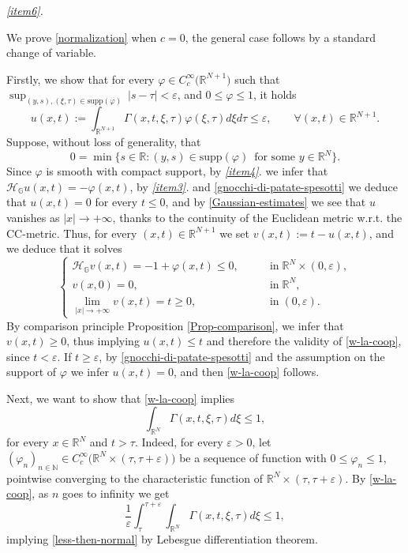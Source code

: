 \documentclass[11pt,a4paper]{article}
\numberwithin{equation}{section}
\newcommand{\R}{\mathbb{R}}
\newcommand{\N}{\mathbb{N}}
\def \rn {{\mathbb {R}}^{N}}
\def \rnn {{\mathbb {R}}^{N+1}}
\def \GG {{\mathbb{G}}}
\def \H {\mathscr{H}_\GG}
\def \G {{\Gamma}}
\def \e {{\varepsilon}}
\def \t {{\tau}}
\def \x {{\xi}}
\def \phi {{\varphi}}
\begin{document}
\begin{pf-fundamental}
	
	\medskip\emph{\ref{item6}.}
	
	
	We prove \eqref{normalization} when $c=0$, the general case follows by a standard change of variable. 
	
	
	Firstly, we show that for every $\phi\in C_c^\infty\big(\rnn\big)$ such that $\sup_{(y,s),(\x,\t)\in \mathrm{supp}(\phi)}\ |s-\t|<\e$, and $0\leq \phi \leq 1$, it holds
	\begin{equation}\label{w-la-coop}
		u(x,t):=\int_{\rnn}\G(x,t,\x,\t)\phi(\x,\t)d\x d\t \leq \e,\qquad \forall (x,t)\in\rnn.
	\end{equation}  
	Suppose, without loss of generality, that 
	\begin{equation}\label{gnocchi-di-patate-spesotti}
		0=\min \Big\{s\in\R : (y,s)\in \mathrm{supp}(\phi)\, \text{ for some } y \in\rn\Big\}.
	\end{equation}	
	Since $\phi$ is smooth with compact support, by \emph{\ref{item4}.} we infer that $\H u(x,t) = -\phi(x,t)$, by \emph{\ref{item3}.}  and \eqref{gnocchi-di-patate-spesotti} we deduce that $u(x,t)=0$ for every $t\leq 0$, and by \eqref{Gaussian-estimates} we see that $u$ vanishes as $|x|\to +\infty$, thanks to the continuity of the Euclidean metric w.r.t. the CC-metric. Thus, for every $(x,t)\in\rnn$ we set $v(x,t):=t-u(x,t)$, and we deduce that it solves 
	\begin{equation}
		\begin{cases}
			\H v(x,t) = -1+\phi(x,t)\leq 0,&\qquad \mathrm{in}\;\rn\times(0,\e), \\
			v(x,0) = 0,&\qquad \mathrm{in}\;\rn,\\
			\displaystyle\lim_{|x|\to+\infty}v(x,t) = t\geq 0,&\qquad \mathrm{in}\;(0,\e). 
		\end{cases}
	\end{equation}
	By comparison principle Proposition \ref{Prop-comparison}, we infer that $v(x,t)\geq 0$, thus implying $u(x,t)\leq t$ and therefore the validity of \eqref{w-la-coop}, since $t<\e$. If $t\geq\e$, by \eqref{gnocchi-di-patate-spesotti} and the assumption on the support of $\phi$ we infer $u(x,t)=0$, and then \eqref{w-la-coop} follows.
	
	
	Next, we want to show that \eqref{w-la-coop} implies
	\begin{equation}\label{less-then-normal}
		\int_{\rn}\G(x,t,\x,\t)d\x \leq 1,
	\end{equation}
	for every $x\in \rn$ and $t>\t$. Indeed, for every $\e>0$, let $(\phi_n)_{n\in\N}\in C_c^\infty\big(\rn\times(\t,\t+\e)\big)$ be a sequence of function with $0\leq \phi_n\leq 1$, pointwise converging to the characteristic function of $\rn\times(\t,\t+\e)$. By \eqref{w-la-coop}, as $n$ goes to infinity we get
	\begin{equation}
		\frac{1}{\e}\int_\t^{\t+\e}\int_{\rn}\G(x,t,\x,\t)d\x \leq 1,
	\end{equation}
	implying \eqref{less-then-normal} by Lebesgue differentiation theorem. 
	

\end{pf-fundamental}
\end{document}
